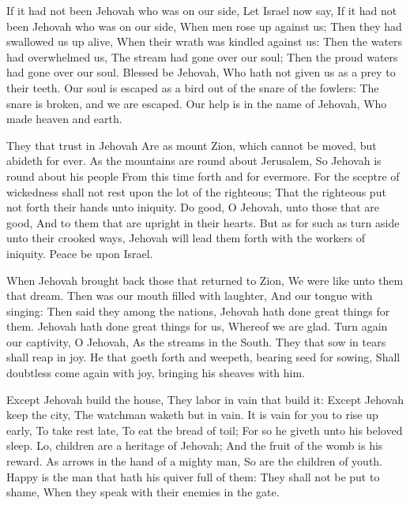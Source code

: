 If it had not been Jehovah who was on our side, Let Israel now say,  If it had not been Jehovah who was on our side, When men rose up against us;  Then they had swallowed us up alive, When their wrath was kindled against us:  Then the waters had overwhelmed us, The stream had gone over our soul;  Then the proud waters had gone over our soul.  Blessed be Jehovah, Who hath not given us as a prey to their teeth.  Our soul is escaped as a bird out of the snare of the fowlers: The snare is broken, and we are escaped.  Our help is in the name of Jehovah, Who made heaven and earth. 

They that trust in Jehovah Are as mount Zion, which cannot be moved, but abideth for ever.  As the mountains are round about Jerusalem, So Jehovah is round about his people From this time forth and for evermore.  For the sceptre of wickedness shall not rest upon the lot of the righteous; That the righteous put not forth their hands unto iniquity.  Do good, O Jehovah, unto those that are good, And to them that are upright in their hearts.  But as for such as turn aside unto their crooked ways, Jehovah will lead them forth with the workers of iniquity. Peace be upon Israel. 

When Jehovah brought back those that returned to Zion, We were like unto them that dream.  Then was our mouth filled with laughter, And our tongue with singing: Then said they among the nations, Jehovah hath done great things for them.  Jehovah hath done great things for us, Whereof we are glad.  Turn again our captivity, O Jehovah, As the streams in the South.  They that sow in tears shall reap in joy.  He that goeth forth and weepeth, bearing seed for sowing, Shall doubtless come again with joy, bringing his sheaves with him. 

Except Jehovah build the house, They labor in vain that build it: Except Jehovah keep the city, The watchman waketh but in vain.  It is vain for you to rise up early, To take rest late, To eat the bread of toil; For so he giveth unto his beloved sleep.  Lo, children are a heritage of Jehovah; And the fruit of the womb is his reward.  As arrows in the hand of a mighty man, So are the children of youth.  Happy is the man that hath his quiver full of them: They shall not be put to shame, When they speak with their enemies in the gate. 


